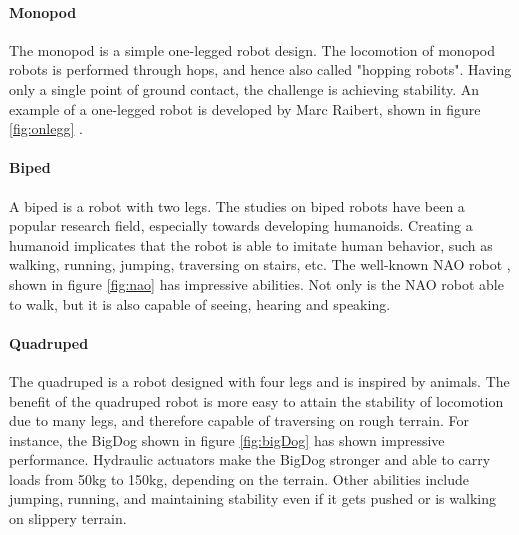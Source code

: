 \documentclass[USenglish]{ifimaster}  %
\begin{document}



\paragraph{Monopod}
The monopod is a simple one-legged robot design. The locomotion of monopod robots is performed through hops, and hence also called "hopping robots". Having only a single point of ground contact, the challenge is achieving stability. An example of a one-legged robot is developed by Marc Raibert, shown in figure \ref{fig:onlegg} \cite{Raibert:1986:LR:5948.5950}.

\paragraph{Biped}
A biped is a robot with two legs. The studies on biped robots have been a popular research field, especially towards developing humanoids. Creating a humanoid implicates that the robot is able to imitate human behavior, such as walking, running, jumping, traversing on stairs, etc. The well-known NAO robot \cite{NAO}, shown in figure \ref{fig:nao} has impressive abilities. Not only is the NAO robot able to walk, but it is also capable of seeing, hearing and speaking. 

\paragraph{Quadruped}
The quadruped is a robot designed with four legs and is inspired by animals. The benefit of the quadruped robot is more easy to attain the stability of locomotion due to many legs, and therefore capable of traversing on rough terrain. For instance, the BigDog \cite{Raibert200810822} shown in figure \ref{fig:bigDog} has shown impressive performance. Hydraulic actuators make the BigDog stronger and able to carry loads from 50kg to 150kg, depending on the terrain. Other abilities include jumping, running, and maintaining stability even if it gets pushed or is walking on slippery terrain.
\end{document}
